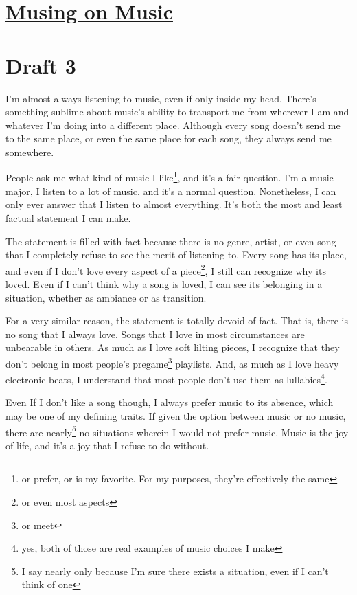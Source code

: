 \documentclass[12pt]{article}[titlepage]
\newcommand{\1}{\={a}}
\newcommand{\2}{\={e}}
\newcommand{\3}{\={\i}}
\newcommand{\4}{\=o}
\newcommand{\5}{\=u}
\newcommand{\6}{\={A}}
\renewcommand{\,}{\textsuperscript{,}}
\begin{document}
\doublespacing

\section{\href{musing_on_music.html}{Musing on Music}}
\section{Draft 3}
I'm almost always listening to music, even if only inside my head.
There's something sublime about music's ability to transport me from wherever I am and whatever I'm doing into a different place.
Although every song doesn't send me to the same place, or even the same place for each song, they always send me somewhere.

People ask me what kind of music I like\footnote{or prefer, or is my favorite. For my purposes, they're effectively the same}, and it's a fair question.
I'm a music major, I listen to a lot of music, and it's a normal question.
Nonetheless, I can only ever answer that I listen to almost everything.
It's both the most and least factual statement I can make.

The statement is filled with fact because there is no genre, artist, or even song that I completely refuse to see the merit of listening to.
Every song has its place, and even if I don't love every aspect of a piece\footnote{or even most aspects}, I still can recognize why its loved.
Even if I can't think why a song is loved, I can see its belonging in a situation, whether as ambiance or as transition.

For a very similar reason, the statement is totally devoid of fact.
That is, there is no song that I always love.
Songs that I love in most circumstances are unbearable in others.
As much as I love soft lilting pieces, I recognize that they don't belong in most people's pregame\footnote{or meet} playlists.
And, as much as I love heavy electronic beats, I understand that most people don't use them as lullabies\footnote{yes, both of those are real examples of music choices I make}.

Even If I don't like a song though, I always prefer music to its absence, which may be one of my defining traits.
If given the option between music or no music, there are nearly\footnote{I say nearly only because I'm sure there exists a situation, even if I can't think of one} no situations wherein I would not prefer music.
Music is the joy of life, and it's a joy that I refuse to do without.
\end{document}
